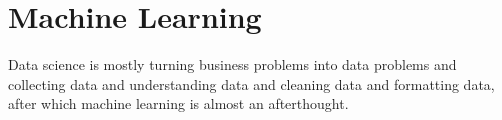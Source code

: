 \chapter{Machine Learning}
Data science is mostly turning business problems into data problems and collecting
data and understanding data and cleaning data and formatting data, after which
machine learning is almost an afterthought.